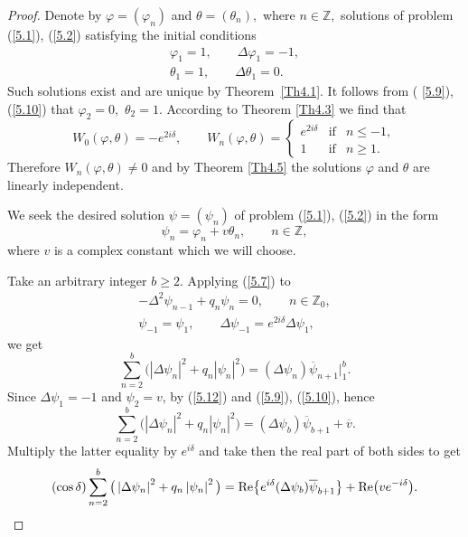 \begin{proof}
Denote by $\varphi =(\varphi _{n})$ and $\theta =(\theta _{n}),$ where $n\in
\mathbb{Z}
,$ solutions of problem (\ref{5.1}), (\ref{5.2}) satisfying the initial
conditions%
\begin{gather}
\varphi _{1}=1,\qquad \Delta \varphi _{1}=-1,  \label{5.9}
\\
\theta _{1}=1,\qquad \Delta \theta _{1}=0.  \label{5.10}
\end{gather}%
Such solutions exist and are unique by Theorem~\ref{Th4.1}. It follows from (%
\ref{5.9}), (\ref{5.10}) that $\varphi _{2}=0,$ $\theta _{2}=1.$ According
to Theorem \ref{Th4.3} we f\/ind that%
\begin{equation}
W_{0}(\varphi ,\theta )=-e^{2i\delta },\qquad W_{n}(\varphi ,\theta
)=\left\{
\begin{array}{lll}
e^{2i\delta } & \text{if} & n\leq -1, \\
1 & \text{if} & n\geq 1.%
\end{array}%
\right.  \label{5.11}
\end{equation}%
Therefore $W_{n}(\varphi ,\theta )\neq 0$ and by Theorem \ref{Th4.5} the
solutions $\varphi $ and $\theta $ are linearly independent.

We seek the desired solution $\psi =(\psi _{n})$ of problem (\ref{5.1}), (\ref{5.2}) in the form%
\begin{equation}
\psi _{n}=\varphi _{n}+v\theta _{n},\qquad n\in
\mathbb{Z}
,  \label{5.12}
\end{equation}%
where $v$ is a complex constant which we will choose.

Take an arbitrary integer $b\geq 2$. Applying (\ref{5.7}) to%
\begin{gather*}
-\Delta ^{2}\psi _{n-1}+q_{n}\psi _{n}=0,\qquad n\in
\mathbb{Z}
_{0},
\\
\psi _{-1}=\psi _{1},\qquad \Delta \psi _{-1}=e^{2i\delta }\Delta \psi
_{1},
\end{gather*}
we get%
\begin{equation*}
\sum_{n=2}^{b}\big( \left\vert \Delta \psi _{n}\right\vert
^{2}+q_{n}\left\vert \psi _{n}\right\vert ^{2}\big) =(\Delta \psi _{n})%
\overline{\psi }_{n+1}\big|_{1}^{b}.  %
\end{equation*}%
Since $\Delta \psi _{1}=-1$ and $\psi _{2}=v$, by (\ref{5.12}) and (\ref{5.9}), (\ref{5.10}), hence%
\[
\sum_{n=2}^{b}\big( \left\vert \Delta \psi _{n}\right\vert
^{2}+q_{n}\left\vert \psi _{n}\right\vert ^{2}\big) =(\Delta \psi _{b})%
\overline{\psi }_{b+1}+\overline{v}.
\]%
Multiply the latter equality by $e^{i\delta }$ and take then the real part
of both sides to get%
\begin{equation}
(\cos \delta )\sum_{n=2}^{b}\big( \left\vert \Delta \psi _{n}\right\vert
^{2}+q_{n}\left\vert \psi _{n}\right\vert ^{2}\big) ={\rm Re}\big\{e^{i\delta
}(\Delta \psi _{b})\overline{\psi }_{b+1}\big\}+{\rm Re}\big(ve^{-i\delta }\big).
\label{5.14}
\end{equation}


\end{proof}
